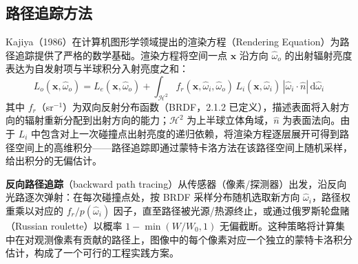 \subsection{路径追踪方法}

Kajiya（1986）\cite{kajiyaRenderingEquation1986}在计算机图形学领域提出的渲染方程（Rendering Equation）为路径追踪提供了严格的数学基础。渲染方程将空间一点 $\mathbf{x}$ 沿方向 $\hat{\omega}_o$ 的出射辐射亮度表达为自发射项与半球积分入射亮度之和：
\begin{equation}
    L_o(\mathbf{x}, \hat{\omega}_o) = L_e(\mathbf{x}, \hat{\omega}_o) +
    \int_{\mathcal{H}^2} f_r(\mathbf{x}, \hat{\omega}_i, \hat{\omega}_o) \,
    L_i(\mathbf{x}, \hat{\omega}_i) \, |\hat{\omega}_i \cdot \hat{n}| \, \mathrm{d}\hat{\omega}_i
    \label{eq:rendering}
\end{equation}
其中 $f_r$（sr$^{-1}$）为双向反射分布函数（BRDF，2.1.2 已定义），描述表面将入射方向的辐射重新分配到出射方向的能力；$\mathcal{H}^2$ 为上半球立体角域，$\hat{n}$ 为表面法向。由于 $L_i$ 中包含对上一次碰撞点出射亮度的递归依赖，将渲染方程逐层展开可得到路径空间上的高维积分——路径追踪即通过蒙特卡洛方法在该路径空间上随机采样，给出积分的无偏估计。

\textbf{反向路径追踪}（backward path tracing）从传感器（像素/探测器）出发，沿反向光路逐次弹射：在每次碰撞点处，按 BRDF 采样分布随机选取新方向 $\hat{\omega}_i$，路径权重乘以对应的 $f_r / p(\hat{\omega}_i)$ 因子，直至路径被光源/热源终止，或通过俄罗斯轮盘赌（Russian roulette）以概率 $1 - \min(W/W_0, 1)$ 无偏截断。这种策略将计算集中在对观测像素有贡献的路径上，图像中的每个像素对应一个独立的蒙特卡洛积分估计，构成了一个可行的工程实践方案。

